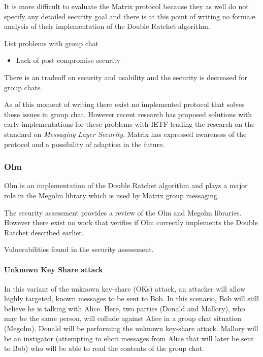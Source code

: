 It is more difficult to evaluate the Matrix protocol because they as well do not specify any detailed security goal and there is at this point of writing no formaæ analysis of their implementation of the Double Ratchet algorithm.


List problems with group chat 

\begin{itemize}
	\item Lack of post compromise security
\end{itemize}

There is an tradeoff on security and usability and the security is decreased for group chats. %

As of this moment of writing there exist no implemented protocol that solves these issues in group chat. However recent research has proposed solutions with early implementations for these problems with IETF leading the research on the standard on \emph{Messaging Layer Security}. Matrix has expressed awareness of the protocol and a possibility of adaption in the future.

\subsubsection{Olm}
Olm is an implementation of the Double Ratchet algorithm and plays a major role in the Megolm library which is used by Matrix group messaging. 

The security assessment provides a review of the Olm and Megolm libraries. However there exist no work that verifies if Olm correctly implements the Double Ratchet described earlier.

Vulnerabilities found in the security assessment. 

\paragraph{Unknown Key Share attack}

In this variant of the unknown key-share (OKs) attack, an attacker will allow highly targeted, known messages to be sent to Bob. In this scenario, Bob will still believe he is talking with Alice. Here, two parties (Donald and Mallory), who may be the same person, will collude against Alice in a group chat situation (Megolm). Donald will be performing the unknown key-share attack. Mallory will be an instigator (attempting to elicit messages from Alice that will later be sent to Bob) who will be able to read the contents of the group chat.

